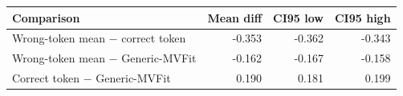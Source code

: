 \begin{tabular}{@{}lrrr@{}}
\toprule
Comparison & Mean diff & CI95 low & CI95 high \\
\midrule
Wrong-token mean $-$ correct token & -0.353 & -0.362 & -0.343 \\
Wrong-token mean $-$ Generic-MVFit & -0.162 & -0.167 & -0.158 \\
Correct token $-$ Generic-MVFit & 0.190 & 0.181 & 0.199 \\
\bottomrule
\end{tabular}
